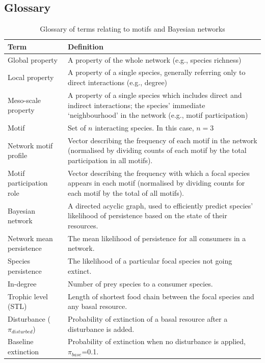 \documentclass[12pt]{article}
\begin{document}
\begin{spacing}{2.0}
\clearpage

\section{Glossary}

 \begin{table}[hb!]
 \label{glossary}
 \caption{Glossary of terms relating to motifs and Bayesian networks}
     \footnotesize{
 \begin{tabular}{l|m{11cm}}
     Term & Definition \\
     \hline
     Global property & A property of the whole network (e.g., species richness) \\
     Local property & A property of a single species, generally referring only to direct interactions (e.g., degree) \\
     Meso-scale property &  A property of a single species which includes direct and indirect interactions; the species' immediate `neighbourhood' in the network (e.g., motif participation) \\
     Motif & Set of $n$ interacting species. In this case, $n=3$ \\
     Network motif profile & Vector describing the frequency of each motif in the network (normalised by dividing counts of each motif by the total participation in  all motifs).\\
     Motif participation role & Vector describing the frequency with which a focal species appears in each motif  (normalised by dividing counts for each motif by the total of all motifs). \\
     Bayesian network & A directed acyclic graph, used to efficiently predict species' likelihood of persistence based on the state of their resources. \\
     Network mean persistence & The mean likelihood of persistence for all consumers in a network.\\
     Species persistence & The likelihood of a particular focal species not going extinct.\\
     In-degree & Number of prey species to a consumer species.\\
     Trophic level (STL) & Length of shortest food chain between the focal species and any basal resource.\\
     Disturbance ($\pi_{disturbed}$) & Probability of extinction of a basal resource after a disturbance is added. \\
     Baseline extinction &  Probability of extinction when no disturbance is applied, $\pi_{base}$=0.1.\\
 \end{tabular}}
 \end{table}
 
\clearpage 

 

\end{spacing}
\end{document}
